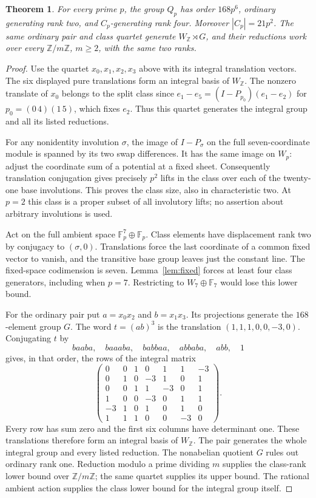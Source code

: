 \documentclass[11pt]{article}
\newtheorem{theorem}{Theorem}
\newcommand{\F}{\mathbb F}
\begin{document}
\begin{theorem}\label{thm:allprimes}
For every prime $p$, the group $Q_p$ has order $168p^6$, ordinary
generating rank two, and $C_p$-generating rank four. Moreover
$|C_p|=21p^2$. The same ordinary pair and class quartet generate
$W_{\mathbb Z}\rtimes G$, and their reductions work over every
$\mathbb Z/m\mathbb Z$, $m\ge2$, with the same two ranks.
\end{theorem}
\begin{proof}
Use the quartet $x_0,x_1,x_2,x_3$ above with its integral translation
vectors. The six displayed pure translations form an integral basis
of $W_{\mathbb Z}$. The nonzero translate of $x_0$ belongs to the
split class since $e_1-e_5=(I-P_{p_0})(e_1-e_2)$ for
$p_0=(0\,4)(1\,5)$, which fixes $e_2$. Thus this quartet generates the integral group and all its
listed reductions.

For any nonidentity involution $\sigma$, the image of $I-P_\sigma$
on the full seven-coordinate module is spanned by its two swap
differences. It has the same image on $W_p$: adjust the coordinate
sum of a potential at a fixed sheet. Consequently translation
conjugation gives precisely $p^2$ lifts in the class over each of
the twenty-one base involutions. This proves the class size, also
in characteristic two. At $p=2$ this class is a proper subset of
all involutory lifts; no assertion about arbitrary involutions is used.

Act on the full ambient space $\F_p^7\oplus\F_p$. Class elements
have displacement rank two by conjugacy to $(\sigma,0)$.
Translations force the last coordinate of a common fixed vector to
vanish, and the transitive base group leaves just the constant line.
The fixed-space codimension is seven. Lemma~\ref{lem:fixed} forces
at least four class generators, including when $p=7$. Restricting
to $W_7\oplus\F_7$ would lose this lower bound.

For the ordinary pair put $a=x_0x_2$ and $b=x_1x_3$. Its projections
generate the $168$-element group $G$. The word $t=(ab)^3$ is the
translation $(1,1,1,0,0,-3,0)$. Conjugating $t$ by
\[
 baaba,\quad baaaba,\quad babbaa,\quad abbaba,\quad abb,\quad 1
\]
gives, in that order, the rows of the integral matrix
\[
\begin{pmatrix}
0&0&1&0&1&1&-3\\
0&1&0&-3&1&0&1\\
0&0&1&1&-3&0&1\\
1&0&0&-3&0&1&1\\
-3&1&0&1&0&1&0\\
1&1&1&0&0&-3&0
\end{pmatrix}.
\]
Every row has sum zero and the first six columns have determinant
one. These translations therefore form an integral basis of
$W_{\mathbb Z}$. The pair generates the whole integral group and
every listed reduction. The nonabelian quotient $G$ rules out
ordinary rank one. Reduction modulo a prime dividing $m$ supplies
the class-rank lower bound over $\mathbb Z/m\mathbb Z$; the same
quartet supplies its upper bound. The rational ambient action
supplies the class lower bound for the integral group itself.
\end{proof}
\end{document}
